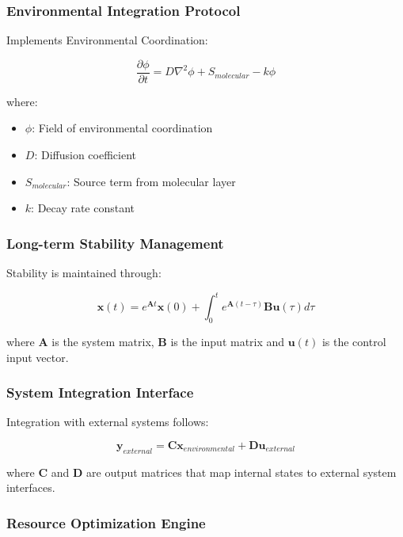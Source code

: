 \documentclass[12pt,a4paper]{article}
\begin{document}
\subsubsection{Environmental Integration Protocol}

Implements Environmental Coordination:

\begin{equation}
\frac{\partial \phi}{\partial t} = D \nabla^2 \phi + S_{molecular} - k \phi
\end{equation}

where:
\begin{itemize}
\item $\phi$: Field of environmental coordination
\item $D$: Diffusion coefficient  
\item $S_{molecular}$: Source term from molecular layer
\item $k$: Decay rate constant
\end{itemize}

\subsubsection{Long-term Stability Management}

Stability is maintained through:

\begin{equation}
\mathbf{x}(t) = e^{\mathbf{A}t} \mathbf{x}(0) + \int_0^t e^{\mathbf{A}(t-\tau)} \mathbf{B} \mathbf{u}(\tau) d\tau
\end{equation}

where $\mathbf{A}$ is the system matrix, $\mathbf{B}$ is the input matrix and $\mathbf{u}(t)$ is the control input vector.

\subsubsection{System Integration Interface}

Integration with external systems follows:

\begin{equation}
\mathbf{y}_{external} = \mathbf{C} \mathbf{x}_{environmental} + \mathbf{D} \mathbf{u}_{external}
\end{equation}

where $\mathbf{C}$ and $\mathbf{D}$ are output matrices that map internal states to external system interfaces.

\subsubsection{Resource Optimization Engine}
\end{document}
